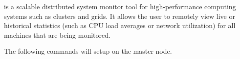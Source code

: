 \Ganglia{} is a scalable distributed system monitor tool for high-performance
computing systems such as clusters and grids. It allows the user to remotely
view live or historical statistics (such as CPU load averages or network
utilization) for all machines that are being monitored.


The following commands will setup \Ganglia{} on the master node.
